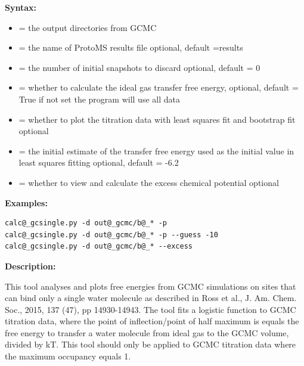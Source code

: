 \documentclass[letterpaper,10pt,english]{manual}
\begin{document}
\textbf{Syntax:}

\begin{itemize}
\item {} 
 = the output directories from GCMC

\item {} 
 = the name of ProtoMS results file
optional, default =results

\item {} 
 = the number of initial snapshots to discard
optional, default = 0

\item {} 
 = whether to calculate the ideal gas transfer free energy,
optional, default = True
if not set the program will use all data

\item {} 
 = whether to plot the titration data with least squares fit and bootstrap fit
optional

\item {} 
 = the initial estimate of the transfer free energy used as the initial value in least squares fitting
optional, default = -6.2

\item {} 
 = whether to view and calculate the excess chemical potential
optional

\end{itemize}

\textbf{Examples:}

\begin{Verbatim}[commandchars=@\[\]]
calc@_gcsingle.py -d out@_gcmc/b@_* -p
calc@_gcsingle.py -d out@_gcmc/b@_* -p --guess -10
calc@_gcsingle.py -d out@_gcmc/b@_* --excess
\end{Verbatim}

\textbf{Description:}

This tool analyses and plots free energies from GCMC simulations on sites that can bind only a single water molecule as described in Ross et al., J. Am. Chem. Soc., 2015, 137 (47), pp 14930-14943. The tool fits a logistic function to GCMC titration data, where the point of inflection/point of half maximum is equals the free energy to transfer a water molecule from ideal gas to the GCMC volume, divided by kT. This tool should only be applied to GCMC titration data where the maximum occupancy equals 1.
\end{document}
